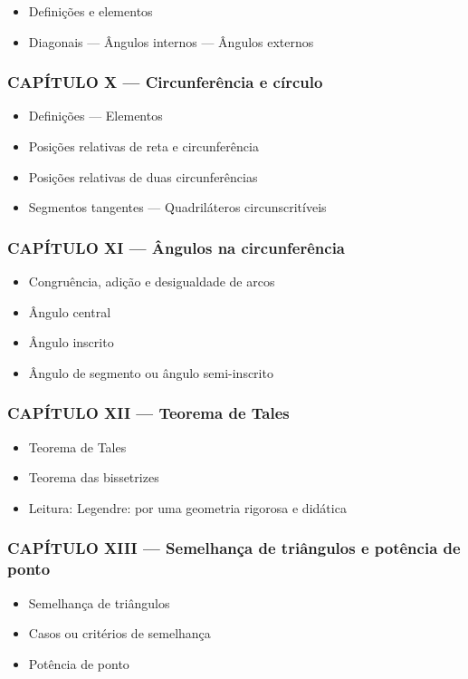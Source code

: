 \documentclass[a4paper,12pt]{article}[abntex2]
\begin{document}
\begin{itemize}
\item Definições e elementos
\item Diagonais — Ângulos internos — Ângulos externos
\end{itemize}
\subsubsection*{CAPÍTULO X — Circunferência e círculo}

\begin{itemize}
\item Definições — Elementos
\item Posições relativas de reta e circunferência
\item Posições relativas de duas circunferências
\item Segmentos tangentes — Quadriláteros circunscritíveis
\end{itemize}
\subsubsection*{CAPÍTULO XI — Ângulos na circunferência}

\begin{itemize}
\item Congruência, adição e desigualdade de arcos
\item Ângulo central
\item Ângulo inscrito
\item Ângulo de segmento ou ângulo semi-inscrito
\end{itemize}
\subsubsection*{CAPÍTULO XII — Teorema de Tales}

\begin{itemize}
\item Teorema de Tales
\item Teorema das bissetrizes
\item Leitura: Legendre: por uma geometria rigorosa e didática
\end{itemize}
\subsubsection*{CAPÍTULO XIII — Semelhança de triângulos e potência de ponto}

\begin{itemize}
\item Semelhança de triângulos
\item Casos ou critérios de semelhança
\item Potência de ponto
\end{itemize}
\end{document}
